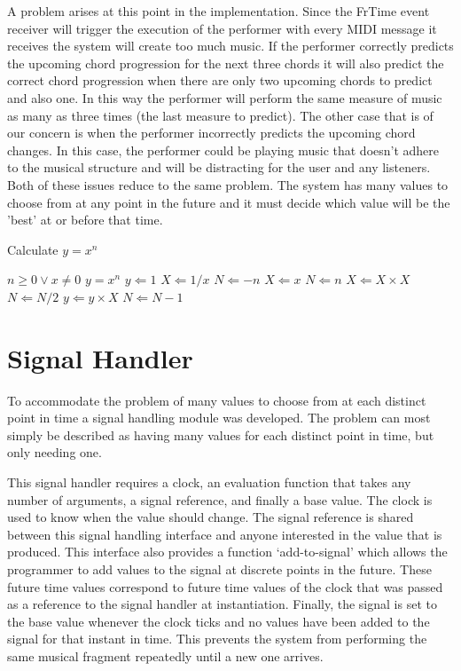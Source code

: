 \documentclass[12pt]{ucthesis}
\begin{document}
{A problem arises at this point in the implementation. Since the FrTime event receiver will trigger the execution of the performer with every MIDI message it receives the system will create too much music. If the performer correctly predicts the upcoming chord progression for the next three chords it will also predict the correct chord progression when there are only two upcoming chords to predict and also one. In this way the performer will perform the same measure of music as many as three times (the last measure to predict). The other case that is of our concern is when the performer incorrectly predicts the upcoming chord changes. In this case, the performer could be playing music that doesn't adhere to the musical structure and will be distracting for the user and any listeners. Both of these issues reduce to the same problem. The system has many values to choose from at any point in the future and it must decide which value will be the 'best' at or before that time.

\begin{algorithm}                      %
\caption{Calculate $y = x^n$}          %
\label{alg1}                           %
\begin{algorithmic}                    %
\REQUIRE $n \geq 0 \vee x \neq 0$
\ENSURE $y = x^n$
\STATE $y \Leftarrow 1$
\STATE $X \Leftarrow 1 / x$
\STATE $N \Leftarrow -n$
\ELSE
\STATE $X \Leftarrow x$
\STATE $N \Leftarrow n$
\ENDIF
{}
\STATE $X \Leftarrow X \times X$
\STATE $N \Leftarrow N / 2$
\ELSE[$N$ is odd]
\STATE $y \Leftarrow y \times X$
\STATE $N \Leftarrow N - 1$
\ENDIF
\ENDWHILE
\end{algorithmic}
\end{algorithm}

\section{Signal Handler}
\label {signal-handler}
To accommodate the problem of many values to choose from at each distinct point in time a signal handling module was developed. The problem can most simply be described as having many values for each distinct point in time, but only needing one. 

This signal handler requires a clock, an evaluation function that takes any number of arguments, a signal reference, and finally a base value. The clock is used to know when the value should change. The signal reference is shared between this signal handling interface and anyone interested in the value that is produced. This interface also provides a function `add-to-signal' which allows the programmer to add values to the signal at discrete points in the future. These future time values correspond to future time values of the clock that was passed as a reference to the signal handler at instantiation. Finally, the signal is set to the base value whenever the clock ticks and no values have been added to the signal for that instant in time. This prevents the system from performing the same musical fragment repeatedly until a new one arrives. 

}
\end{document}
